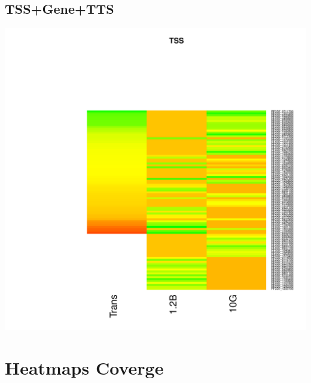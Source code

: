 \documentclass{article}\usepackage[]{graphicx}\usepackage[]{color}
\newenvironment{knitrout}{}{} %
\begin{document}
\subsection{TSS+Gene+TTS}
\begin{knitrout}
\color{fgcolor}

{\centering \includegraphics[width=.9\linewidth]{figure/minimal-heatmap_all-1} 

}



\end{knitrout}

\clearpage
\section{Heatmaps Coverge}
\end{document}
